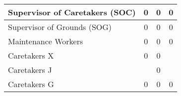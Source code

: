 \begin{tabular}{l|c|c|c|}
        \multicolumn{1}{|l|}{\cellcolor{ccfuschialight}Supervisor of Caretakers (SOC)} & 0                                                      & 0                                                                & 0                                                      \\ \hline
        \multicolumn{1}{|l|}{\cellcolor{ccfuschialight}Supervisor of Grounds (SOG)}    & 0                                                      & 0                                                                & 0                                                      \\ \hline
        \multicolumn{1}{|l|}{\cellcolor{ccfuschialight}Maintenance Workers}            & 0                                                      & 0                                                                & 0                                                       \\ \hline
        \multicolumn{1}{|l|}{\cellcolor{ccfuschialight}Caretakers X}                   & 0                                                      & 0                                                                &                                                       \\ \cline{1-3}
        \multicolumn{1}{|l|}{\cellcolor{ccfuschialight}Caretakers J\tnote{2}}                   &                                                       & 0                                                                &                                                         \\ \cline{1-1} \cline{3-3}
        \multicolumn{1}{|l|}{\cellcolor{ccfuschialight}Caretakers G}                   & \multirow{-2}{*}{0}                                                      & 0                                     & \multirow{-3}{*}{0 \tnote{3}}                           \\ \hline
        \end{tabular}
        
        